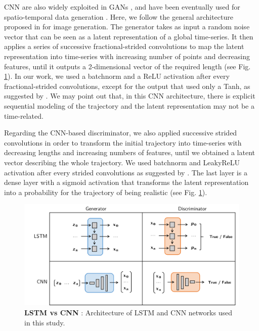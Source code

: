 \documentclass{article}
\begin{document}
CNN are also widely exploited in GANs \citep{radford_unsupervised_2016}, and have been eventually used for spatio-temporal data generation \citep{gao_generative_2020}. Here, we follow the general architecture proposed in \cite{radford_unsupervised_2016} for image generation. The generator takes as input a random noise vector that can be seen as a latent representation of a global time-series. It then applies a series of successive fractional-strided convolutions to map the latent representation into time-series with increasing number of points and decreasing features, until it outputs a 2-dimensional vector of the required length (see Fig. \ref{1_cnn_lstm}). In our work, we used a batchnorm and a ReLU activation after every fractional-strided convolutions, except for the output that used only a Tanh, as suggested by \citep{radford_unsupervised_2016}. We may point out that, in this CNN architecture, there is explicit sequential modeling of the trajectory and the latent representation may not be a time-related.  

Regarding the CNN-based discriminator, we also applied successive strided convolutions in order to transform the initial trajectory into time-series with decreasing lengths and increasing numbers of features, until we obtained a latent vector describing the whole trajectory. We used batchnorm and LeakyReLU activation after every strided convolutions as suggested by \citep{radford_unsupervised_2016}. The last layer is a dense layer  with a sigmoid activation that transforms the latent representation into a probability for the trajectory of being realistic (see Fig. \ref{1_cnn_lstm}).

\begin{figure}[h]
  \centering
  \includegraphics[scale=0.37]{1_cnn_lstm.png}
  \caption{\textbf{LSTM vs CNN} : Architecture of LSTM and CNN networks used in this study.}
  \label{1_cnn_lstm}
\end{figure}
\end{document}
